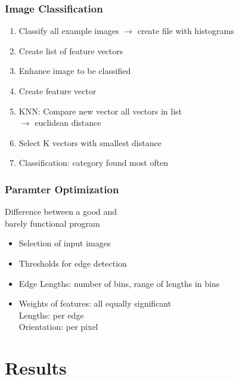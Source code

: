 \documentclass{beamer}
\begin{document}
\begin{frame}
	\frametitle{Image Classification}
	\begin{enumerate}
		\item Classify all example images $\rightarrow$ create file with histograms
		\item Create list of feature vectors
		\item Enhance image to be classified
		\item Create feature vector
		\item KNN: Compare new vector all vectors in list\\
		$\rightarrow$ euclidean distance\\
		\item Select K vectors with smallest distance
		\item Classification: category found most often
	\end{enumerate}
	
\end{frame}

\begin{frame}
	\frametitle{Paramter Optimization}
	\begin{block}{}
	Difference between a good and \\barely functional program 
	\end{block}
	\begin{itemize}
		\item Selection of input images
		\item Thresholds for edge detection
		\item Edge Lengths: number of bins, range of lengths in bins
		\item Weights of features:  all equally significant
		\\Lengths: per edge
		\\Orientation: per pixel
	\end{itemize}
	
\end{frame}

\section{Results}
\end{document}

